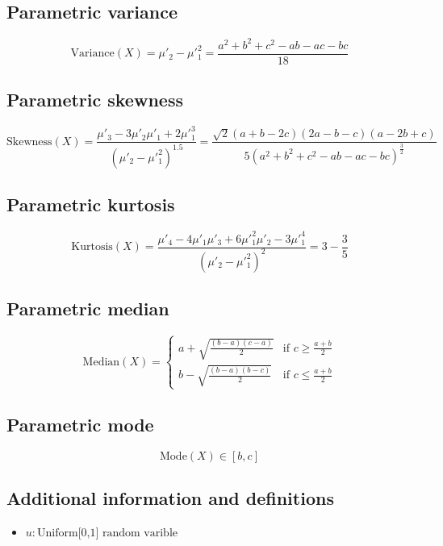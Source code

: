 \documentclass{article}
\begin{document}
\subsection{Parametric variance}
\begin{equation*} \mathrm{Variance}(X)=\mu'_{2}-\mu'^{2}_{1}=\frac{a^2+b^2+c^2-ab-ac-bc}{18} \end{equation*}
\subsection{Parametric skewness}
\begin{equation*} \mathrm{Skewness}(X)=\frac{\mu'_{3}-3\mu'_{2}\mu'_{1}+2\mu'^{3}_{1}}{(\mu'_{2}-\mu'^{2}_{1})^{1.5}}=\frac{\sqrt 2 (a\!+\!b\!-\!2c)(2a\!-\!b\!-\!c)(a\!-\!2b\!+\!c)}{5(a^2\!+\!b^2\!+\!c^2\!-\!ab\!-\!ac\!-\!bc)^\frac{3}{2}} \end{equation*}
\subsection{Parametric kurtosis}
\begin{equation*} \mathrm{Kurtosis}(X)=\frac{\mu'_{4}-4\mu'_{1}\mu'_{3}+6\mu'^{2}_{1}\mu'_{2}-3\mu'^{4}_{1}}{(\mu'_{2}-\mu'^{2}_{1})^{2}}=3-\frac{3}{5} \end{equation*}
\subsection{Parametric median}
\begin{equation*} \mathrm{Median}(X)=\left\{\begin{array}{cl} a+\sqrt{\frac{(b-a)(c-a)}{2}} & \text{if } c \ge\frac{a+b}{2} \\ b-\sqrt{\frac{(b-a)(b-c)}{2}} & \text{if } c \le\frac{a+b}{2} \end{array} \right. \end{equation*}
\subsection{Parametric mode}
\begin{equation*} \mathrm{Mode}(X)\in [b,c] \end{equation*}
\subsection{Additional information and definitions}
\begin{itemize}
    \item $ u:\text{Uniform[0,1] random varible} $
\end{itemize}
\end{document}
